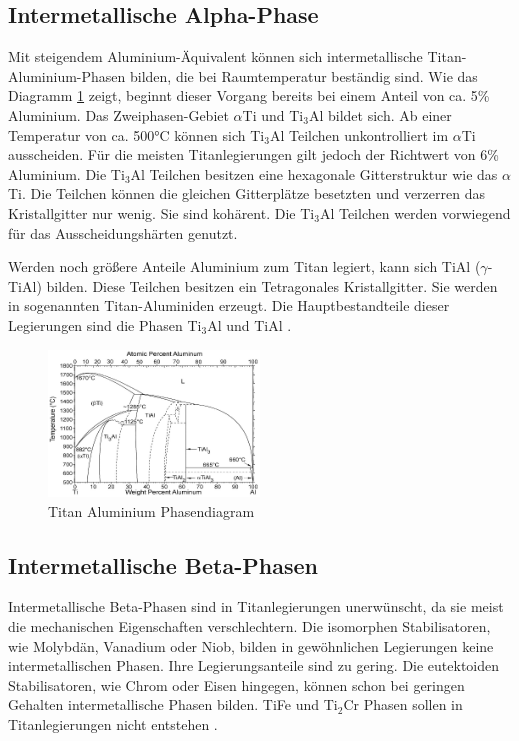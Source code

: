 \documentclass[a4paper, 11pt]{tubsreprt}
\begin{document}
\subsection{Intermetallische Alpha-Phase}
Mit steigendem Aluminium-Äquivalent können sich intermetallische Titan-Aluminium-Phasen bilden, die bei Raumtemperatur beständig sind. Wie das Diagramm \ref{Titan Aluminium Phasendiagramm} zeigt, beginnt dieser Vorgang bereits bei einem Anteil von ca. 5\% Aluminium. Das Zweiphasen-Gebiet $\alpha$Ti und Ti$_{3}$Al bildet sich. Ab einer Temperatur von ca. 500°C können sich Ti$_{3}$Al Teilchen unkontrolliert im $\alpha$Ti ausscheiden. Für die meisten Titanlegierungen gilt jedoch der Richtwert von 6\% Aluminium. Die Ti$_{3}$Al Teilchen besitzen eine hexagonale Gitterstruktur wie das $\alpha$Ti. Die Teilchen können die gleichen Gitterplätze besetzten und verzerren das Kristallgitter nur wenig. Sie sind kohärent. Die Ti$_{3}$Al Teilchen werden vorwiegend für das Ausscheidungshärten genutzt.   

Werden noch größere Anteile Aluminium zum Titan legiert, kann sich TiAl ($\gamma$-TiAl) bilden. Diese Teilchen besitzen ein Tetragonales Kristallgitter. Sie werden in sogenannten Titan-Aluminiden erzeugt. Die Hauptbestandteile dieser Legierungen sind die Phasen Ti$_{3}$Al und TiAl \cite{Luetjering2007}.   
  
\begin{figure}
\centering
\includegraphics[width=0.5\textwidth]{Bilder/Titanaluminide.png}
\caption[Titan Aluminium Phasendiagramm]{Titan Aluminium Phasendiagram\cite{Luetjering2007}}
\label{Titan Aluminium Phasendiagramm}
\end{figure}

 \newpage
\subsection{Intermetallische Beta-Phasen}
Intermetallische Beta-Phasen sind in Titanlegierungen unerwünscht, da sie meist die mechanischen Eigenschaften verschlechtern. Die isomorphen Stabilisatoren, wie Molybdän, Vanadium oder Niob, bilden in gewöhnlichen Legierungen keine intermetallischen Phasen. Ihre Legierungsanteile sind zu gering. Die eutektoiden Stabilisatoren, wie Chrom oder Eisen hingegen, können schon bei geringen Gehalten intermetallische Phasen bilden. TiFe und Ti$_{2}$Cr Phasen sollen in Titanlegierungen nicht entstehen \cite{Luetjering2007}.   
\end{document}
